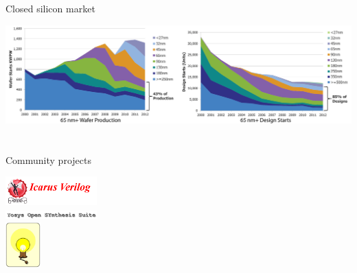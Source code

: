 \documentclass[9pt]{beamer}
\begin{document}
\begin{frame}{Closed silicon market}
	\begin{center}
		\hspace*{-0.3in}
		\includegraphics[width=1.15\textwidth]{market-closing.png} \\
	\end{center}
	
\end{frame}

\section[Who]{}
\begin{frame}{Community projects}
	\begin{center}
		\includegraphics[width=100pt]{Icarus.png} \\
		\includegraphics[width=100pt]{Yosys.png} \\
		\includegraphics[height=50pt]{Opencircuit.png}
	\end{center}
\end{frame}
\end{document}
